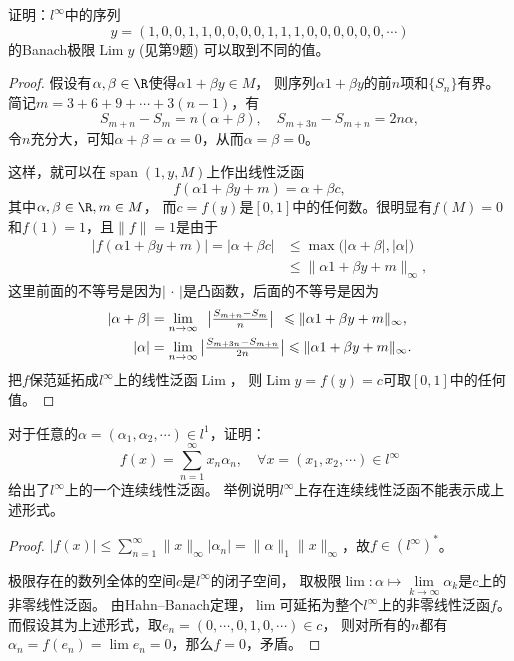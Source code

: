\begin{10}
    证明：$l^\infty$中的序列
    \[y=(1,0,0,1,1,0,0,0,0,1,1,1,0,0,0,0,0,0,\cdots)\]
    的Banach极限$\operatorname{Lim}y$ (见第9题) 可以取到不同的值。
\end{10}
\begin{proof}
    假设有$\alpha,\beta\in\R$使得$\alpha 1+\beta y \in M$，
    则序列$\alpha 1+\beta y$的前$n$项和$\{S_n\}$有界。
    简记$m=3+6+9+\cdots+3(n-1)$，有
    \[S_{m+n}-S_m=n(\alpha+\beta),\quad S_{m+3n}-S_{m+n}=2n\alpha,\]
    令$n$充分大，可知$\alpha+\beta=\alpha=0$，从而$\alpha=\beta=0$。
    
    这样，就可以在$\operatorname{span}(1,y,M)$上作出线性泛函
    \[f(\alpha 1+\beta y+m)=\alpha+\beta c,\]
    其中$\alpha,\beta\in\R,m \in M$，
    而$c=f(y)$是$[0,1]$中的任何数。很明显有$f(M)=0$和$f(1)=1$，且$\|f\|=1$是由于
    \begin{align*}
        |f(\alpha 1+\beta y+m)|=|\alpha+\beta c|
        &\leqslant\max(|\alpha+\beta|,|\alpha|\big)\\
        &\leqslant\|\alpha 1+\beta y+m\|_\infty,
    \end{align*}
    这里前面的不等号是因为$|\,\cdot\,|$是凸函数，后面的不等号是因为
    \begin{align*}
        |\alpha+\beta|&=\lim_{n\to\infty}\hspace{0.5em}\big|\tfrac{S_{m+n}-S_m}{n}\big|\hspace{0.45em}
        \leqslant\|\alpha 1+\beta y+m\|_\infty,\\
        |\alpha|&=\lim_{n\to\infty}\big|\tfrac{S_{m+3n}-S_{m+n}}{2n}\big|
        \leqslant\|\alpha 1+\beta y+m\|_\infty.
    \end{align*}
    把$f$保范延拓成$l^\infty$上的线性泛函$\operatorname{Lim}$，
    则$\operatorname{Lim}y=f(y)=c$可取$[0,1]$中的任何值。
\end{proof}

\begin{11}
    对于任意的$\alpha=(\alpha_1,\alpha_2,\cdots) \in l^1$，证明：
    $$f(x)=\sum_{n=1}^\infty x_n\alpha_n,\quad
    \forall x=(x_1,x_2,\cdots) \in l^\infty$$
    给出了$l^\infty$上的一个连续线性泛函。
    举例说明$l^\infty$上存在连续线性泛函不能表示成上述形式。
\end{11}
\begin{proof}
    $|f(x)|\leqslant\sum\limits_{n=1}^\infty\|x\|_\infty|\alpha_n|
    =\|\alpha\|_1\|x\|_\infty$，故$f\in(l^\infty)^*$。

    极限存在的数列全体的空间$c$是$l^\infty$的闭子空间，
    取极限$\lim\colon\alpha\mapsto\lim\limits_{k\to\infty}\alpha_k$是$c$上的非零线性泛函。
    由Hahn--Banach定理，$\lim$可延拓为整个$l^\infty$上的非零线性泛函$f$。
    而假设其为上述形式，取$e_n=(0,\cdots,0,1,0,\cdots)\in c$，
    则对所有的$n$都有$\alpha_n=f(e_n)=\lim e_n=0$，那么$f=0$，矛盾。
\end{proof}

